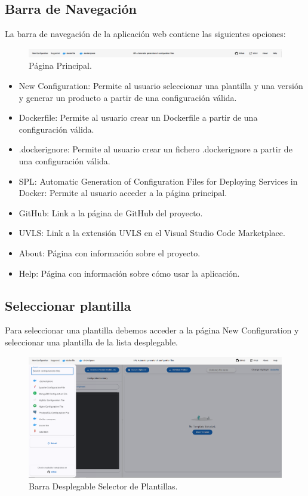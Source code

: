 \documentclass[12pt, a4paper, twoside]{article}
\begin{document}
\begin{umaappendices}
	\subsection{Barra de Navegación}
	La barra de navegación de la aplicación web contiene las siguientes opciones:
	\begin{figure}[ht]
		\centering
			\includegraphics[width=1\textwidth]{navpage.png}
		\caption{Página Principal.}
	\end{figure}
	\begin{itemize}
		\item 	New Configuration: Permite al usuario seleccionar una plantilla y una versión y generar un producto a partir de una configuración válida.
		\item 	Dockerfile: Permite al usuario crear un Dockerfile a partir de una configuración válida.
		\item 	.dockerignore: Permite al usuario crear un fichero .dockerignore a partir de una configuración válida.
		\item 	SPL: Automatic Generation of Configuration Files for Deploying Services in Docker: Permite al usuario acceder a la página principal.
		\item 	GitHub: Link a la página de GitHub del proyecto.
		\item 	UVLS: Link a la extensión UVLS en el Visual Studio Code Marketplace.
		\item 	About: Página con información sobre el proyecto.
		\item 	Help: Página con información sobre cómo usar la aplicación.
	
	\end{itemize}

	

	\subsection{Seleccionar plantilla}
	Para seleccionar una plantilla debemos acceder a la página New Configuration y seleccionar una plantilla de la lista desplegable.

	\begin{figure}[h]
		\centering
			\includegraphics[width=1\textwidth]{selectTemplatePage.png}
		\caption{Barra Desplegable Selector de Plantillas.}
	\end{figure}
	\newpage

\end{umaappendices}
\end{document}
